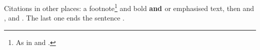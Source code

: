 \documentclass[11pt]{article}
\begin{document}
Citations in other places: a footnote\footnote{As in \citet{x} and \citep[p.~2]{y}.}
and bold \textbf{\citep{x} and \citet{y}} or emphasised \emph{\citealp{x}} text, then
\citeauthor[p.~1]{x} and \citeyear[p.~2]{y}, \cite[see][]{x} and \cite[][p.~9]{y}. The last one ends the sentence \citep{z}.


\end{document}
